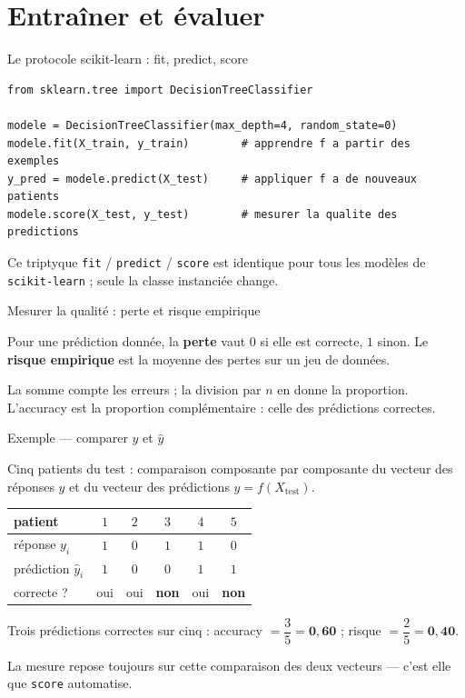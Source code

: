 \documentclass[aspectratio=169,11pt]{beamer}
\begin{document}
\section{Entraîner et évaluer}

\begin{frame}[fragile]{Le protocole scikit-learn : fit, predict, score}
\begin{lstlisting}
from sklearn.tree import DecisionTreeClassifier

modele = DecisionTreeClassifier(max_depth=4, random_state=0)
modele.fit(X_train, y_train)        # apprendre f a partir des exemples
y_pred = modele.predict(X_test)     # appliquer f a de nouveaux patients
modele.score(X_test, y_test)        # mesurer la qualite des predictions
\end{lstlisting}
{\small Ce triptyque \texttt{fit} / \texttt{predict} / \texttt{score} est identique pour tous les modèles de \texttt{scikit-learn} ; seule la classe instanciée change.}
\end{frame}

\begin{frame}{Mesurer la qualité : perte et risque empirique}
\begin{ucaddef}[La perte 0/1]
{\small Pour une prédiction donnée, la \textbf{perte} vaut $0$ si elle est correcte, $1$ sinon. Le \textbf{risque empirique} est la moyenne des pertes sur un jeu de données.}
\end{ucaddef}
{\small La somme compte les erreurs ; la division par $n$ en donne la proportion. L'accuracy est la proportion complémentaire : celle des prédictions correctes.}
\end{frame}

\begin{frame}{Exemple — comparer $y$ et $\hat y$}
\begin{ucadex}
{\small Cinq patients du test : comparaison composante par composante du vecteur des réponses $y$ et du vecteur des prédictions $\hat y = f(X_{\text{test}})$.
\begin{center}\begin{tabular}{l|ccccc}
patient & $1$ & $2$ & $3$ & $4$ & $5$\\\hline
réponse $y_i$ & $1$ & $0$ & $1$ & $1$ & $0$\\
prédiction $\hat y_i$ & $1$ & $0$ & $0$ & $1$ & $1$\\
correcte ? & oui & oui & \textbf{non} & oui & \textbf{non}\\
\end{tabular}\end{center}
Trois prédictions correctes sur cinq : accuracy $= \dfrac{3}{5} = \mathbf{0{,}60}$ ; risque $= \dfrac{2}{5} = \mathbf{0{,}40}$.}
\end{ucadex}
{\small La mesure repose toujours sur cette comparaison des deux vecteurs — c'est elle que \texttt{score} automatise.}
\end{frame}
\end{document}
